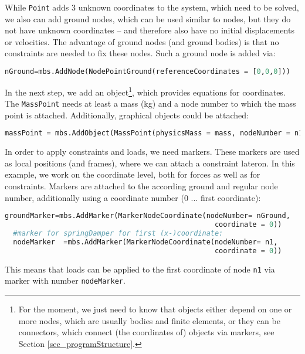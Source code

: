 %
While \texttt{Point} adds 3 unknown coordinates to the system, which need to be solved, we also can add ground nodes, which can be used similar to nodes, but they do not have unknown coordinates -- and therefore also have no initial displacements or velocities. The advantage of ground nodes (and ground bodies) is that no constraints are needed to fix these nodes.
Such a ground node is added via:
\begin{lstlisting}[language=Python, firstnumber=22]
  nGround=mbs.AddNode(NodePointGround(referenceCoordinates = [0,0,0]))
\end{lstlisting}
%
In the next step, we add an object\footnote{For the moment, we just need to know that objects either depend on one or more nodes, which are usually bodies and finite elements, or they can be connectors, which connect (the coordinates of) objects via markers, see Section \ref{sec_programStructure}.}, which provides equations for coordinates. The \texttt{MassPoint} needs at least a mass (kg) and a node number to which the mass point is attached. Additionally, graphical objects could be attached:
\begin{lstlisting}[language=Python, firstnumber=23]
  massPoint = mbs.AddObject(MassPoint(physicsMass = mass, nodeNumber = n1))
\end{lstlisting}
%
In order to apply constraints and loads, we need markers. These markers are used as local positions (and frames), where we can attach a constraint lateron. In this example, we work on the coordinate level, both for forces as well as for constraints.
Markers are attached to the according ground and regular node number, additionally using a coordinate number (0 ... first coordinate):
\begin{lstlisting}[language=Python, firstnumber=24]
  groundMarker=mbs.AddMarker(MarkerNodeCoordinate(nodeNumber= nGround, 
                                                  coordinate = 0))
  #marker for springDamper for first (x-)coordinate:
  nodeMarker  =mbs.AddMarker(MarkerNodeCoordinate(nodeNumber= n1, 
                                                  coordinate = 0))
\end{lstlisting}
This means that loads can be applied to the first coordinate of node \texttt{n1} via marker with number \texttt{nodeMarker}.

